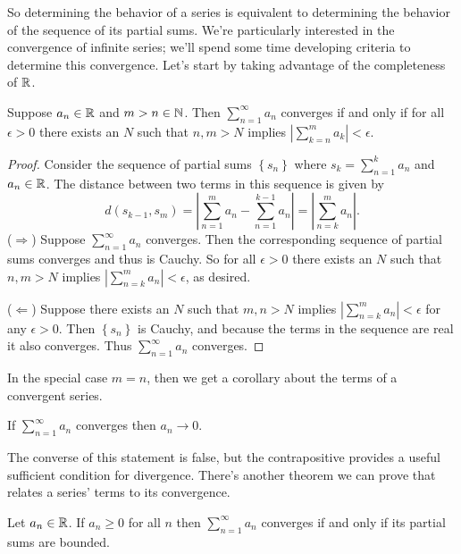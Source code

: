 \documentclass[../m131main.tex]{subfiles}
\begin{document}
So determining the behavior of a series is equivalent to determining the behavior of the sequence of its partial sums.
We're particularly interested in the convergence of infinite series; we'll spend some time developing criteria to determine this convergence.
Let's start by taking advantage of the completeness of $\mathbb{R}$.

\begin{theorem}
    Suppose $a_n \in \mathbb{R}$ and $m > n \in \mathbb{N}$.
    Then $\sum_{n=1}^{\infty} a_n$ converges if and only if for all $\epsilon > 0$ there exists an $N$ such that $n,m > N$ implies $\left| \sum_{k=n}^{m} a_k \right| < \epsilon$.
\end{theorem}

\begin{proof}
    Consider the sequence of partial sums $\left\{ s_n \right\}$ where $s_k = \sum_{n=1}^{k} a_n$ and $a_n \in \mathbb{R}$.
    The distance between two terms in this sequence is given by
    \[ d(s_{k-1}, s_m) = \left| \sum_{n=1}^{m} a_n - \sum_{n=1}^{k-1} a_n \right| = \left| \sum_{n=k}^{m} a_n \right|. \]
    ($\Rightarrow$) Suppose $\sum_{n=1}^{\infty} a_n$ converges.
    Then the corresponding sequence of partial sums converges and thus is Cauchy.
    So for all $\epsilon > 0$ there exists an $N$ such that $n,m > N$ implies $\left| \sum_{n=k}^{m} a_n \right| < \epsilon$, as desired.

    ($\Leftarrow$) Suppose there exists an $N$ such that $m,n > N$ implies $\left| \sum_{n=k}^{m} a_n \right| < \epsilon$ for any $\epsilon > 0$.
    Then $\left\{ s_n \right\}$ is Cauchy, and because the terms in the sequence are real it also converges.
    Thus $\sum_{n=1}^{\infty} a_n$ converges.
\end{proof} %

In the special case $m=n$, then we get a corollary about the terms of a convergent series.

\begin{corollary}
    If $\sum_{n=1}^{\infty} a_n$ converges then $a_n \to 0$.
\end{corollary}

The converse of this statement is false, but the contrapositive provides a useful sufficient condition for divergence.
There's another theorem we can prove that relates a series' terms to its convergence.

\begin{theorem}
    Let $a_n \in \mathbb{R}$.
    If $a_n \geq 0$ for all $n$ then $\sum_{n=1}^{\infty} a_n$ converges if and only if its partial sums are bounded.
\end{theorem}
\end{document}
